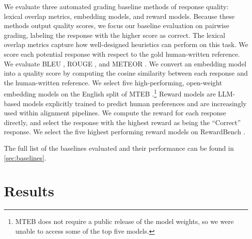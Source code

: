 \documentclass{article}
\begin{document}
We evaluate three automated grading baseline methods of response quality: lexical overlap metrics, embedding models, and reward models. Because these methods output quality scores, we focus our baseline evaluation on pairwise grading, labeling the response with the higher score as correct. The lexical overlap metrics capture how well-designed heuristics can perform on this task. We score each potential response with respect to the gold human-written reference. We evaluate BLEU \citep{bleu}, ROUGE \citep{rouge}, and METEOR \citep{meteor}. We convert an embedding model into a quality score by computing the cosine similarity between each response and the human-written reference. We select five high-performing, open-weight embedding models on the English split of MTEB \citep{mteb}.\footnote{MTEB does not require a public release of the model weights, so we were unable to access some of the top five models.} Reward models are LLM-based models explicitly trained to predict human preferences and are increasingly used within alignment pipelines. We compute the reward for each response directly, and select the response with the highest reward as being the ``Correct'' response. We select the five highest performing reward models on RewardBench \citep{RewardBench}. 
 
The full list of the baselines evaluated and their performance can be found in \cref{sec:baselines}.

\section{Results}


\end{document}
